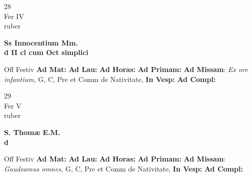 \documentclass[10pt, openany]{book}
\begin{document}
    \begin{center}
        \begin{minipage}{3.5in}
            \vspace{2em}
            \begin{minipage}{0.5in}
                {\Huge 28} \\
                {\normalsize Fer IV} \\
                {\normalsize ruber}
            \end{minipage}
            \begin{minipage}{3.0in}
                \textbf{ \large Ss Innocentium Mm. \\
                \textnormal{\normalsize d II cl cum Oct simplici}} \\ 
            \end{minipage}
            \begin{justify}Off Festiv
                \textbf{Ad Mat: }
                \textbf{Ad Lau: }
                \textbf{Ad Horas: }
                \textbf{Ad Primam: }\textbf{Ad Missam}: \textit{Ex ore infantium,} G, C, Pre et Comm de Nativitate,  
                \textbf{In Vesp: }
                \textbf{Ad Compl: }
            \end{justify}
        \end{minipage}
    \end{center}

    \begin{center}
        \begin{minipage}{3.5in}
            \vspace{2em}
            \begin{minipage}{0.5in}
                {\Huge 29} \\
                {\normalsize Fer V} \\
                {\normalsize ruber}
            \end{minipage}
            \begin{minipage}{3.0in}
                \textbf{ \large S. Thomæ E.M. \\
                \textnormal{\normalsize d}} \\ 
            \end{minipage}
            \begin{justify}Off Festiv
                \textbf{Ad Mat: }
                \textbf{Ad Lau: }
                \textbf{Ad Horas: }
                \textbf{Ad Primam: }\textbf{Ad Missam}: \textit{Gaudeamus omnes,} G, C, Pre et Comm de Nativitate,  
                \textbf{In Vesp: }
                \textbf{Ad Compl: }
            \end{justify}
        \end{minipage}
    \end{center}
\end{document}
